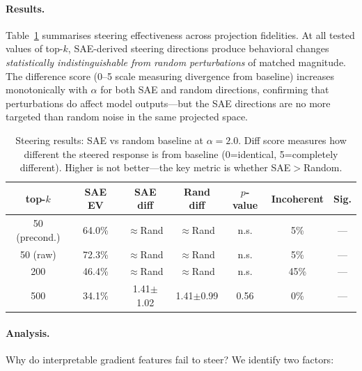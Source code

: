 \paragraph{Results.} Table~\ref{tab:steering-results} summarises steering effectiveness across projection fidelities. At all tested values of top-$k$, SAE-derived steering directions produce behavioral changes \emph{statistically indistinguishable from random perturbations} of matched magnitude. The difference score (0--5 scale measuring divergence from baseline) increases monotonically with $\alpha$ for both SAE and random directions, confirming that perturbations do affect model outputs---but the SAE directions are no more targeted than random noise in the same projected space.

\begin{table}[t]
\centering
\caption{Steering results: SAE vs random baseline at $\alpha{=}2.0$. Diff score measures how different the steered response is from baseline (0=identical, 5=completely different). Higher is not better---the key metric is whether SAE$>$Random.}
\label{tab:steering-results}
\small
\begin{tabular}{ccccccc}
\toprule
\textbf{top-$k$} & \textbf{SAE EV} & \textbf{SAE diff} & \textbf{Rand diff} & \textbf{$p$-value} & \textbf{Incoherent} & \textbf{Sig.} \\
\midrule
50 (precond.)  & 64.0\% & $\approx$Rand & $\approx$Rand & n.s. & 5\%  & --- \\
50 (raw)       & 72.3\% & $\approx$Rand & $\approx$Rand & n.s. & 5\%  & --- \\
200            & 46.4\% & $\approx$Rand & $\approx$Rand & n.s. & 45\% & --- \\
500            & 34.1\% & 1.41$\pm$1.02 & 1.41$\pm$0.99 & 0.56 & 0\%  & --- \\
\bottomrule
\end{tabular}
\end{table}

\paragraph{Analysis.} Why do interpretable gradient features fail to steer? We identify two factors:

